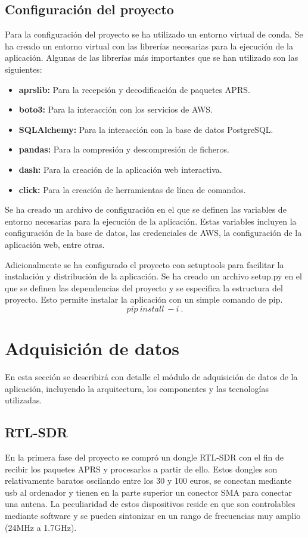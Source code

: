 \subsection*{Configuración del proyecto}

Para la configuración del proyecto se ha utilizado un entorno virtual de conda. Se ha creado un entorno virtual con las librerías necesarias para la ejecución de la aplicación. Algunas de las librerías más importantes que se han utilizado son las siguientes:

\begin{itemize}
	\item \textbf{aprslib:} Para la recepción y decodificación de paquetes APRS.
	\item \textbf{boto3:} Para la interacción con los servicios de AWS.
	\item \textbf{SQLAlchemy:} Para la interacción con la base de datos PostgreSQL.
	\item \textbf{pandas:} Para la compresión y descompresión de ficheros.
	\item \textbf{dash:} Para la creación de la aplicación web interactiva.
	\item \textbf{click:} Para la creación de herramientas de línea de comandos.
\end{itemize}

Se ha creado un archivo de configuración en el que se definen las variables de entorno necesarias para la ejecución de la aplicación. Estas variables incluyen la configuración de la base de datos, las credenciales de AWS, la configuración de la aplicación web, entre otras.

Adicionalmente se ha configurado el proyecto con setuptools para facilitar la instalación y distribución de la aplicación. Se ha creado un archivo setup.py en el que se definen las dependencias del proyecto y se especifica la estructura del proyecto. Esto permite instalar la aplicación con un simple comando de pip.
$$pip\ install\ -i\ .$$

\section{Adquisición de datos}
En esta sección se describirá con detalle el módulo de adquisición de datos de la aplicación, incluyendo la arquitectura, los componentes y las tecnologías utilizadas.

\subsection*{RTL-SDR}
En la primera fase del proyecto se compró un dongle RTL-SDR con el fin de recibir los paquetes APRS y procesarlos a partir de ello. Estos dongles son relativamente baratos oscilando entre los 30 y 100 euros, se conectan mediante usb al ordenador y tienen en la parte superior un conector SMA para conectar una antena. La peculiaridad de estos dispositivos reside en que son controlables mediante software y se pueden sintonizar en un rango de frecuencias muy amplio (24MHz a 1.7GHz).

